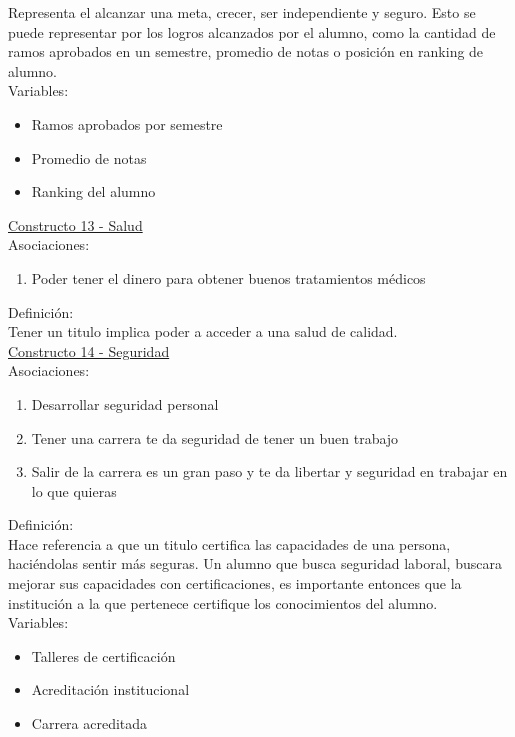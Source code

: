Representa el alcanzar una meta, crecer, ser independiente y seguro. Esto se puede representar por los logros alcanzados por el alumno, como la cantidad de ramos aprobados en un semestre, promedio de notas o posición en ranking de alumno.\\

Variables:\\
\begin{itemize}
	\item Ramos aprobados por semestre
	\item Promedio de notas
	\item Ranking del alumno	
\end{itemize} 

\underline {Constructo 13 - Salud} \\
Asociaciones:
\begin{enumerate}
	\item Poder tener el dinero para obtener buenos tratamientos médicos
		
\end{enumerate}

Definición:\\
Tener un titulo implica poder a acceder a una salud de calidad.\\


\underline {Constructo 14 - Seguridad} \\
Asociaciones:
\begin{enumerate}
	\item Desarrollar seguridad personal
	\item Tener una carrera te da seguridad de tener un buen trabajo	
	\item Salir de la carrera es un gran paso y te da libertar y seguridad en trabajar en lo que quieras
\end{enumerate}

Definición:\\

Hace referencia a que un titulo certifica las capacidades de una persona, haciéndolas sentir más seguras. Un alumno que busca seguridad laboral, buscara mejorar sus capacidades con certificaciones, es importante entonces que la institución a la que pertenece certifique los conocimientos del alumno.\\

Variables:\\
\begin{itemize}
	\item Talleres de certificación
	\item Acreditación institucional
	\item Carrera acreditada	
\end{itemize} 

